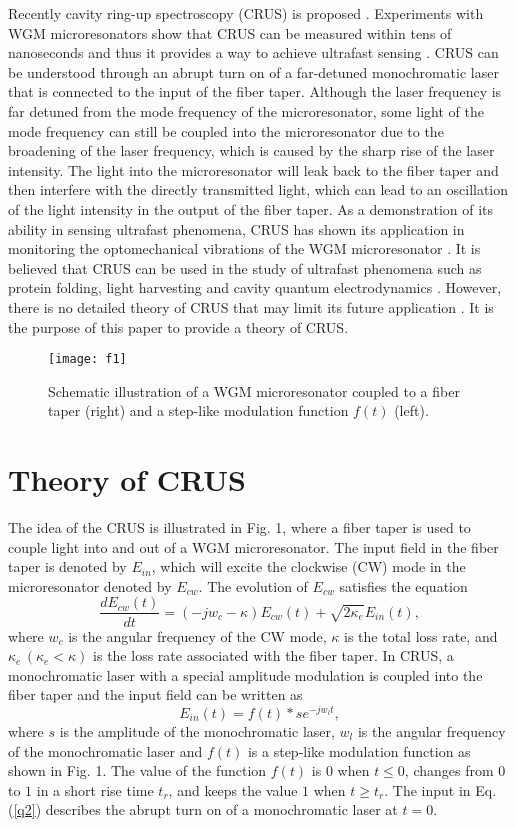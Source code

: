 \documentclass[aps,onecolumn,superscriptaddress,showpacs]{revtex4}
\begin{document}
Recently cavity ring-up spectroscopy (CRUS) is proposed \cite{rosenblum2015}. Experiments with WGM microresonators show that CRUS can be measured within tens of nanoseconds
and thus it provides a way to achieve  ultrafast sensing  \cite{rosenblum2015}.
CRUS can be understood through an abrupt turn on of a far-detuned monochromatic laser that is connected to the input of the fiber taper.
Although the laser frequency is far detuned from the mode frequency of the microresonator, some light of the mode frequency can still be coupled into the microresonator due to
the  broadening of the laser frequency, which is caused by the sharp rise of the laser intensity.
The light into the microresonator will leak back to the fiber taper and
then interfere with the directly transmitted light, which can lead to an oscillation of the light intensity in the output of the fiber taper.
As a demonstration of its ability in sensing ultrafast phenomena, CRUS has shown its application in monitoring the optomechanical vibrations of the WGM microresonator \cite{rosenblum2015}.
It is believed that CRUS can be used in the study of ultrafast phenomena such as protein folding, light harvesting and cavity quantum electrodynamics \cite{rosenblum2015}.
However, there is no detailed theory of CRUS that may limit its future application \cite{yang2016}.
It is the purpose of this paper to provide a theory of CRUS.
\begin{figure}[htbp]
\centering\texttt{[image: f1]}
\caption{Schematic illustration of a WGM microresonator coupled to a fiber taper (right) and a step-like modulation function $f(t)$ (left).}
\end{figure}

\section{Theory of CRUS}
The idea of the CRUS is illustrated in Fig. 1, where a fiber taper is used to couple light into and out of a WGM microresonator.
The input field in the fiber taper is denoted by $E_{in}$, which will excite the clockwise (CW) mode in the microresonator
denoted by $E_{cw}$. The evolution of $E_{cw}$ satisfies the equation \cite{Righini2011}
\begin{equation}
\frac{dE_{cw}(t)}{dt}=(-jw_c-\kappa)E_{cw}(t)+ \sqrt{2\kappa_e}E_{in}(t),  \label{q1}
\end{equation}
where $w_c$ is the angular frequency of the CW mode, $\kappa$ is the total loss rate, and $\kappa_e \,(\kappa_e<\kappa)$ is the loss rate associated with the fiber taper.
In CRUS, a monochromatic laser with a special amplitude modulation is coupled into the fiber taper and
the input field can be written as
\begin{equation}
  E_{in}(t)=f(t)* s e^{-jw_l t}, \label{q2}
\end{equation}
where $s$ is the amplitude of the monochromatic laser, $w_l$ is the angular frequency of the monochromatic laser and $f(t)$ is a step-like modulation function as shown in Fig. 1.
The value of the function $f(t)$ is $0$ when $t\leq0$, changes from $0$ to $1$ in a short rise time $t_r$, and keeps the value $1$ when $t\geq t_r$.
The input in Eq. (\ref{q2}) describes the abrupt turn on of a monochromatic laser at $t=0$.
\end{document}
